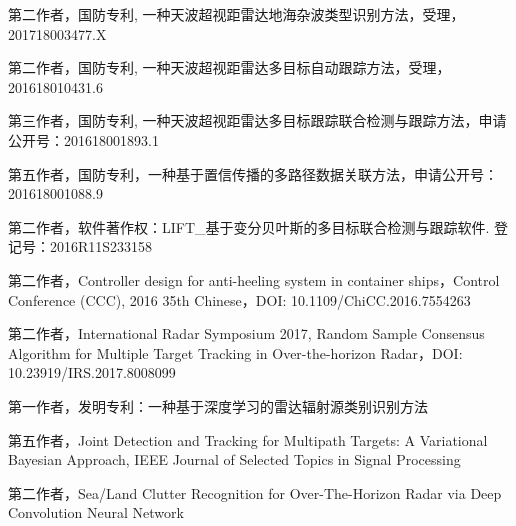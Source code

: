 第二作者，国防专利, 一种天波超视距雷达地海杂波类型识别方法，受理，201718003477.X

第二作者，国防专利, 一种天波超视距雷达多目标自动跟踪方法，受理，201618010431.6

第三作者，国防专利, 一种天波超视距雷达多目标跟踪联合检测与跟踪方法，申请公开号：201618001893.1

第五作者，国防专利，一种基于置信传播的多路径数据关联方法，申请公开号：201618001088.9

第二作者，软件著作权：LIFT_基于变分贝叶斯的多目标联合检测与跟踪软件. 登记号：2016R11S233158

第二作者，Controller design for anti-heeling system in container ships，Control Conference (CCC), 2016 35th Chinese，DOI: 10.1109/ChiCC.2016.7554263

第二作者，International Radar Symposium 2017, Random Sample Consensus Algorithm for Multiple Target Tracking in Over-the-horizon Radar，DOI: 10.23919/IRS.2017.8008099

第一作者，发明专利：一种基于深度学习的雷达辐射源类别识别方法

第五作者，Joint Detection and Tracking for Multipath Targets: A Variational Bayesian Approach, IEEE Journal of Selected Topics in Signal Processing

第二作者，Sea/Land Clutter Recognition for Over-The-Horizon Radar via Deep Convolution Neural Network
